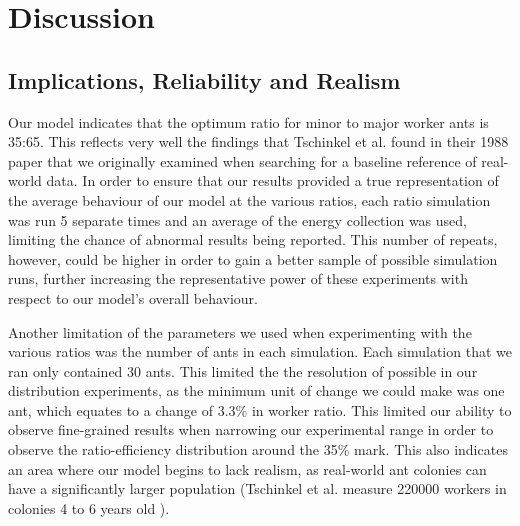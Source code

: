 \section{Discussion}



\subsection{Implications, Reliability and Realism}
Our model indicates that the optimum ratio for minor to major worker ants is 35:65. This reflects very well the findings that Tschinkel et al. found in their 1988 paper \cite{Tschinkel1988} that we originally examined when searching for a baseline reference of real-world data. In order to ensure that our results provided a true representation of the average behaviour of our model at the various ratios, each ratio
simulation was run 5 separate times and an average of the energy collection was used, limiting the chance of abnormal results being reported. This number of repeats, however, could be higher in order to gain a better sample of possible simulation runs, further increasing the representative power of these experiments with respect to our model's overall behaviour.

Another limitation of the parameters we used when experimenting with the various ratios was the number of ants in each simulation. Each simulation that we ran only contained 30 ants. This limited the the resolution of possible in our distribution experiments, as the minimum unit of change we could make was one ant, which equates to a change of 3.3\% in worker
ratio. This limited our ability to observe fine-grained results when narrowing our experimental range in order to observe the ratio-efficiency distribution around the 35\% mark. This also indicates an area where our model begins to lack realism, as real-world ant colonies can have a significantly larger population (Tschinkel et al. measure 220000 workers in colonies 4 to 6 years old \cite{Tschinkel1988}).

